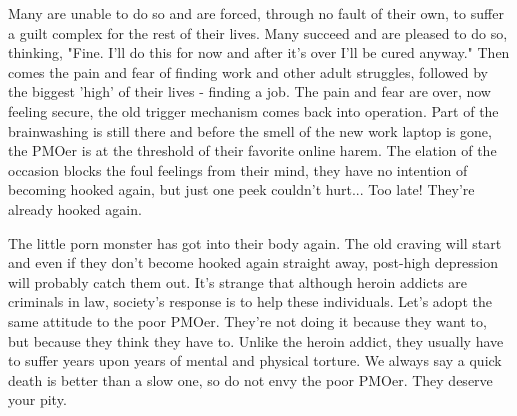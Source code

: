 \documentclass[easypeasy.tex]{subfiles}
\begin{document}
Many are unable to do so and are forced, through no fault of their own, to suffer a guilt complex for the rest of their lives. Many succeed and are pleased to do so, thinking, "Fine. I'll do this for now and after it's over I'll be cured anyway." Then comes the pain and fear of finding work and other adult struggles, followed by the biggest 'high' of their lives - finding a job. The pain and fear are over, now feeling secure, the old trigger mechanism comes back into operation. Part of the brainwashing is still there and before the smell of the new work laptop is gone, the PMOer is at the threshold of their favorite online harem. The elation of the occasion blocks the foul feelings from their mind, they have no intention of becoming hooked again, but just one peek couldn't hurt... Too late! They're already hooked again.

The little porn monster has got into their body again. The old craving will start and even if they don't become hooked again straight away, post-high depression will probably catch them out. It's strange that although heroin addicts are criminals in law, society's response is to help these individuals. Let's adopt the same attitude to the poor PMOer. They're not doing it because they want to, but because they think they have to. Unlike the heroin addict, they usually have to suffer years upon years of mental and physical torture. We always say a quick death is better than a slow one, so do not envy the poor PMOer. They deserve your pity.
\end{document}
